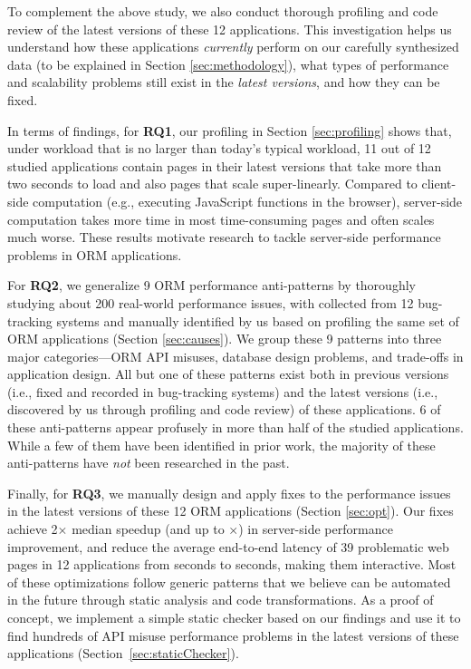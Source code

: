 To complement the above study, we also conduct thorough profiling and code review of the latest versions of these 12 applications. This investigation helps us understand how these applications \textit{currently} perform on our carefully synthesized data (to be explained in Section \ref{sec:methodology}),  what types of performance and scalability problems still exist in the \textit{latest versions}, and how they can be fixed.

In terms of findings,
for {\bf RQ1}, our profiling in Section \ref{sec:profiling} shows that, under workload that is no larger than today's typical 
workload, 11 out of 12 studied applications contain pages in their latest versions that take more than two seconds to load and also pages that scale super-linearly. Compared to client-side computation (e.g., executing JavaScript functions in the browser), server-side computation takes more time in most time-consuming pages and often scales much worse. 
These results motivate research to tackle server-side performance problems in ORM applications.

For {\bf RQ2}, we generalize 9 ORM performance anti-patterns by thoroughly studying about 200 real-world performance issues, with \numissues collected from 12 bug-tracking systems and \numacissues manually identified by us based on profiling the same set of ORM applications (Section \ref{sec:causes}).  We group these 9 patterns into three major categories---ORM API misuses, database design problems, and trade-offs in application design.
All but one of these patterns exist both in previous versions (i.e., fixed and recorded in bug-tracking systems) and the latest versions (i.e., discovered by us through profiling and code review) of these applications.
6 of these anti-patterns appear profusely in more than half of the studied applications. While a few of them have been identified in prior work, the majority of these anti-patterns have \textit{not} been researched in the past.

Finally, for {\bf RQ3}, we manually design and apply fixes to the \numacissues performance issues in the latest versions of these 12 ORM applications (Section \ref{sec:opt}). Our fixes achieve 2$\times$ median speedup (and up to \maxspeedup$\times$) in server-side performance improvement, and reduce the average end-to-end latency of 39 problematic web pages in 12 applications from \eoebefore seconds to \eoeafter seconds, making them interactive.
Most of these optimizations follow generic patterns that we believe can be automated in the future through static analysis and code transformations. As a proof of concept, we implement a simple static checker based on our findings and use it to find hundreds of API misuse performance problems in the latest versions of these applications (Section~\ref{sec:staticChecker}).

